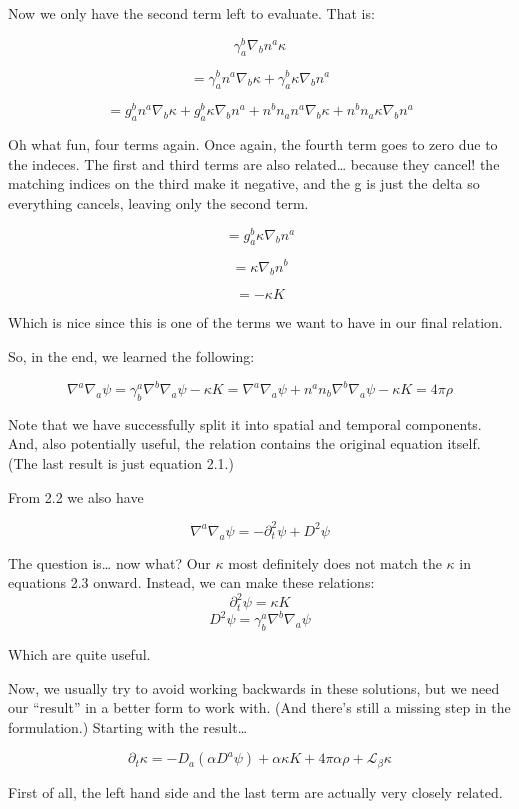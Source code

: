 \documentclass[landscape,letterpaper,10pt,english]{article}
\begin{document}
    Now we only have the second term left to evaluate. That is:

\[ \gamma^b_a \nabla_b n^a \kappa \]

\[ = \gamma^b_a n^a \nabla_b \kappa + \gamma^b_a \kappa \nabla_b n^a\]

\[ = g^b_a n^a \nabla_b \kappa + g^b_a \kappa \nabla_b n^a + n^bn_a n^a \nabla_b \kappa + n^bn_a \kappa \nabla_b n^a\]

    Oh what fun, four terms again. Once again, the fourth term goes to zero
due to the indeces. The first and third terms are also related\ldots{}
because they cancel! the matching indices on the third make it negative,
and the g is just the delta so everything cancels, leaving only the
second term.

\[ = g^b_a \kappa \nabla_b n^a \]

\[ = \kappa \nabla_b n^b \]

\[ = - \kappa K \]

Which is nice since this is one of the terms we want to have in our
final relation.

So, in the end, we learned the following:

\[ \nabla^a \nabla_a \psi = \gamma^a_b \nabla^b \nabla_a \psi - \kappa K = \nabla^a \nabla_a \psi + n^an_b \nabla^b \nabla_a \psi -\kappa K = 4\pi \rho\]

Note that we have successfully split it into spatial and temporal
components. And, also potentially useful, the relation contains the
original equation itself. (The last result is just equation 2.1.)

From 2.2 we also have

\[ \nabla^a \nabla_a \psi = -\partial_t^2 \psi + D^2 \psi \]

    The question is\ldots{} now what? Our \(\kappa\) most definitely does
not match the \(\kappa\) in equations 2.3 onward. Instead, we can make
these relations: \[ \partial_t^2 \psi = \kappa K \]
\[ D^2 \psi = \gamma^a_b \nabla^b \nabla_a \psi \]

    Which are quite useful.

Now, we usually try to avoid working backwards in these solutions, but
we need our ``result'' in a better form to work with. (And there's still
a missing step in the formulation.) Starting with the result\ldots{}

\[ \partial_t \kappa = -D_a(\alpha D^a \psi) + \alpha \kappa K + 4\pi \alpha\rho + \mathcal{L}_\beta \kappa \]

First of all, the left hand side and the last term are actually very
closely related.
\end{document}
